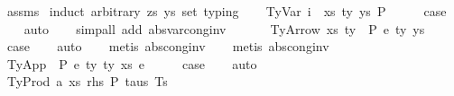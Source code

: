 \begin{isabellebody}
%
\isadelimproof
%
\endisadelimproof
%
\isatagproof
{}\isamarkupfalse%
\ assms\isanewline
{}\isamarkupfalse%
\ {\isacharparenleft}{\kern0pt}induct\ arbitrary{\isacharcolon}{\kern0pt}\ zs\ ys\ set{\isacharcolon}{\kern0pt}\ typing{\isacharparenright}{\kern0pt}\isanewline
\ \ \isamarkupfalse%
\ {\isacharparenleft}{\kern0pt}TyVar\ i\ {\isasymGamma}\ xs\ ty\ ys\ P{\isacharparenright}{\kern0pt}\isanewline
\ \ \isamarkupfalse%
\ \isamarkupfalse%
\ {\isacharquery}{\kern0pt}case\isanewline
\ \ \isamarkupfalse%
\ auto\isanewline
\ \ \isamarkupfalse%
\ {\isacharparenleft}{\kern0pt}simp{\isacharunderscore}{\kern0pt}all\ add{\isacharcolon}{\kern0pt}\ abs{\isacharunderscore}{\kern0pt}var{\isacharunderscore}{\kern0pt}cong{\isacharunderscore}{\kern0pt}inv{\isacharparenright}{\kern0pt}\isanewline
\ \ \isamarkupfalse%
\isanewline
{}\isamarkupfalse%
\isanewline
\ \ \isamarkupfalse%
\ {\isacharparenleft}{\kern0pt}TyArrow\ xs\ ty{}\ {\isasymGamma}\ P\ e\ ty{}\ ys{\isacharparenright}{\kern0pt}\isanewline
\ \ \isamarkupfalse%
\ \isamarkupfalse%
\ {\isacharquery}{\kern0pt}case\isanewline
\ \ \isamarkupfalse%
\ auto\isanewline
\ \ \isamarkupfalse%
\ {\isacharparenleft}{\kern0pt}metis\ abs{\isacharunderscore}{\kern0pt}cong{\isacharunderscore}{\kern0pt}inv{\isacharparenright}{\kern0pt}\isanewline
\ \ \isamarkupfalse%
\ {\isacharparenleft}{\kern0pt}metis\ abs{\isacharunderscore}{\kern0pt}cong{\isacharunderscore}{\kern0pt}inv{\isacharparenright}{\kern0pt}\isanewline
\ \ \isamarkupfalse%
\isanewline
{}\isamarkupfalse%
\isanewline
\ \ \isamarkupfalse%
\ {\isacharparenleft}{\kern0pt}TyApp\ {\isasymGamma}\ P\ e{}\ ty{}\ ty{}\ xs\ e{}{\isacharparenright}{\kern0pt}\isanewline
\ \ \isamarkupfalse%
\ \isamarkupfalse%
\ {\isacharquery}{\kern0pt}case\isanewline
\ \ \isamarkupfalse%
\ auto\isanewline
\ \ \isamarkupfalse%
\isanewline
{}\isamarkupfalse%
\isanewline
\ \ \isamarkupfalse%
\ {\isacharparenleft}{\kern0pt}TyProd\ a\ xs\ rhs\ P\ taus\ Ts\ {\isasymGamma}{\isacharparenright}{\kern0pt}\isanewline
\ \ \isamarkupfalse%

\end{isabellebody}
